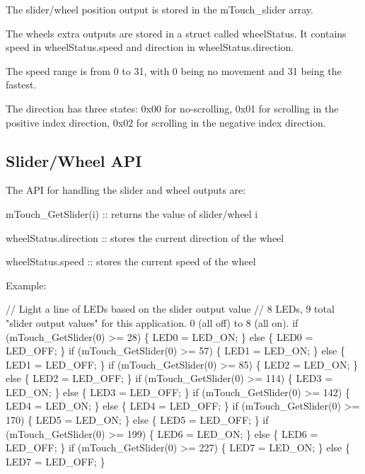 \begin{DoxyItemize}
\item The slider/wheel position output is stored in the m\+Touch\+\_\+slider array. 
\item The wheel\textquotesingle{}s extra outputs are stored in a struct called wheel\+Status. It contains speed in wheel\+Status.\+speed and direction in wheel\+Status.\+direction. 
\begin{DoxyItemize}
\item The speed range is from 0 to 31, with 0 being no movement and 31 being the fastest. 
\item The direction has three states\+: 0x00 for no-\/scrolling, 0x01 for scrolling in the positive index direction, 0x02 for scrolling in the negative index direction. 
\end{DoxyItemize}
\end{DoxyItemize}\hypertarget{feat_sliders_featSlider-API}{}\subsection{Slider/\+Wheel A\+P\+I}\label{feat_sliders_featSlider-API}
The A\+P\+I for handling the slider and wheel outputs are\+: 
\begin{DoxyItemize}
\item m\+Touch\+\_\+\+Get\+Slider(i) \+:\+: returns the value of slider/wheel i 
\item wheel\+Status.\+direction \+:\+: stores the current direction of the wheel 
\item wheel\+Status.\+speed \+:\+: stores the current speed of the wheel 
\end{DoxyItemize}

Example\+: 
\begin{DoxyCode}
\textcolor{comment}{// Light a line of LEDs based on the slider output value}
\textcolor{comment}{// 8 LEDs, 9 total "slider output values" for this application. 0 (all off) to 8 (all on).}
\textcolor{keywordflow}{if} (mTouch\_GetSlider(0) >= 28)  \{ LED0 = LED\_ON; \} \textcolor{keywordflow}{else} \{ LED0 = LED\_OFF; \}
\textcolor{keywordflow}{if} (mTouch\_GetSlider(0) >= 57)  \{ LED1 = LED\_ON; \} \textcolor{keywordflow}{else} \{ LED1 = LED\_OFF; \}
\textcolor{keywordflow}{if} (mTouch\_GetSlider(0) >= 85)  \{ LED2 = LED\_ON; \} \textcolor{keywordflow}{else} \{ LED2 = LED\_OFF; \}
\textcolor{keywordflow}{if} (mTouch\_GetSlider(0) >= 114) \{ LED3 = LED\_ON; \} \textcolor{keywordflow}{else} \{ LED3 = LED\_OFF; \}
\textcolor{keywordflow}{if} (mTouch\_GetSlider(0) >= 142) \{ LED4 = LED\_ON; \} \textcolor{keywordflow}{else} \{ LED4 = LED\_OFF; \}
\textcolor{keywordflow}{if} (mTouch\_GetSlider(0) >= 170) \{ LED5 = LED\_ON; \} \textcolor{keywordflow}{else} \{ LED5 = LED\_OFF; \}
\textcolor{keywordflow}{if} (mTouch\_GetSlider(0) >= 199) \{ LED6 = LED\_ON; \} \textcolor{keywordflow}{else} \{ LED6 = LED\_OFF; \}
\textcolor{keywordflow}{if} (mTouch\_GetSlider(0) >= 227) \{ LED7 = LED\_ON; \} \textcolor{keywordflow}{else} \{ LED7 = LED\_OFF; \}
\end{DoxyCode}



